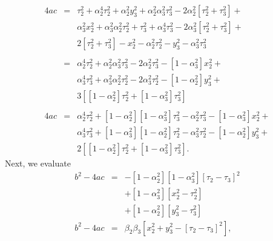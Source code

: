 \documentclass[twocolumn]{article}
\begin{document}
\begin{eqnarray}
   \nonumber
   4ac &=&
           \tau_2^2 + \alpha_2^4 \tau_2^2 + \alpha_2^2 y_3^2 + \alpha_2^2
           \alpha_3^2 \tau_3^2 - 2 \alpha_2^2 \left[\tau_2^2 + \tau_3^2\right]
           +\\
   \nonumber
   &&
           \alpha_3^2 x_2^2 + \alpha_3^2 \alpha_2^2 \tau_2^2 + \tau_3^2 +
           \alpha_3^4 \tau_3^2 - 2 \alpha_3^2 \left[\tau_2^2 + \tau_3^2\right]
           +\\
   \nonumber
   &&
           2 \left[\tau_2^2 + \tau_3^2\right] - x_2^2 - \alpha_2^2 \tau_2^2 -
           y_3^2 - \alpha_3^2 \tau_3^2\\
   \nonumber\\
   \nonumber
   &=&
           \alpha_2^4 \tau_2^2 + \alpha_2^2 \alpha_3^2 \tau_3^2 - 2 \alpha_2^2
           \tau_3^2 - \left[1 - \alpha_3^2\right] x_2^2 +\\
   \nonumber
   &&
           \alpha_3^4 \tau_3^2 + \alpha_3^2 \alpha_2^2 \tau_2^2 - 2 \alpha_3^2
           \tau_2^2 - \left[1 - \alpha_2^2\right] y_3^2 +\\
   \nonumber
   &&
           3 \left[\left[1 - \alpha_2^2\right]\tau_2^2 + \left[1 -
           \alpha_3^2\right] \tau_3^2\right]\\
   \nonumber\\
   \nonumber
   4ac &=&
           \alpha_2^4 \tau_2^2 + \left[1 - \alpha_2^2\right] \left[1 -
           \alpha_3^2\right] \tau_3^2 - \alpha_2^2\tau_3^2 - \left[1 -
           \alpha_3^2\right] x_2^2 +\\
   \nonumber
   &&
           \alpha_3^4 \tau_3^2 + \left[1 - \alpha_3^2\right] \left[1 -
           \alpha_2^2\right] \tau_2^2 - \alpha_3^2 \tau_2^2 - \left[1 -
           \alpha_2^2\right] y_3^2 +\\
   &&
           2 \left[\left[1 - \alpha_2^2\right]\tau_2^2 + \left[1 -
           \alpha_3^2\right] \tau_3^2\right].
\end{eqnarray}
Next, we evaluate
\begin{eqnarray}
   \nonumber
   b^2 - 4ac &=& - \left[1 - \alpha_2^2\right] \left[1 - \alpha_3^2\right]
                   \left[\tau_2 - \tau_3\right]^2\\
   \nonumber
              && + \left[1 - \alpha_3^2\right] \left[x_2^2 - \tau_2^2\right]\\
   \nonumber
              && + \left[1 - \alpha_2^2\right] \left[y_3^2 - \tau_3^2\right]\\
   b^2 - 4ac &=& \beta_2 \beta_3 \left[x_2^2 + y_3^2 - \left[\tau_2 -
                 \tau_3\right]^2\right],
\end{eqnarray}
\end{document}
